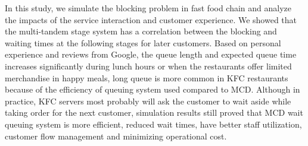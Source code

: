 	In this study, we simulate the blocking problem in fast food chain and analyze the impacts of the service interaction and customer experience. We showed that the multi-tandem stage system has a correlation between the blocking and waiting times at the following stages for later customers. Based on personal experience and reviews from Google, the queue length and expected queue time increases significantly during lunch hours or when the restaurants offer limited merchandise in happy meals, long queue is  more common in KFC restaurants because of the efficiency of queuing system used compared to MCD. Although in practice, KFC servers most probably will ask the customer to wait aside while taking order for the next customer, simulation results still proved that MCD wait queuing system is more efficient, reduced wait times, have better staff utilization, customer flow management and minimizing operational cost.